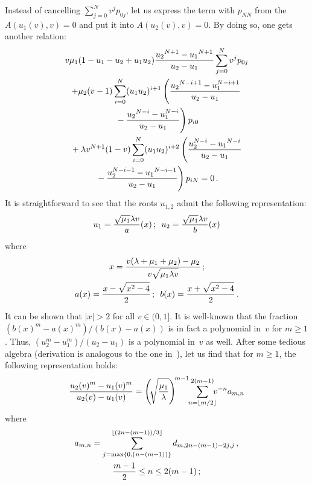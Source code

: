 \begin{multicols}{2}
\noindent
Instead of cancelling $\sum_{j=0}^N v^j p_{0j}$, let us express 
the term with $p_{NN}$ from the {$A(u_1(v),v)=0$}
and put it into ${A(u_2(v),v)=0}$. By doing so, one gets another relation:
\begin{multline}
v\mu_1(1-u_1-u_2+u_1u_2)
\displaystyle\frac{\displaystyle {u_2}^{N+1}-{u_1}^{N+1}\mathstrut}{\displaystyle u_2-u_1\mathstrut} \sum\limits_{j=0}^N v^j p_{0j}
\\
+{}
\mu_2(v-1)\sum\limits_{i=0}^N (u_1u_2)^{i+1}
\left (
\displaystyle\frac{\displaystyle {u_2}^{N-i+1}-u_1^{N-i+1}\mathstrut}{\displaystyle u_2-u_1\mathstrut}\right.\\
\left.{}-\displaystyle\frac{\displaystyle {u_2}^{N-i}-u_1^{N-i}\mathstrut}{\displaystyle u_2-u_1\mathstrut}
\right) p_{i0} 
\\
{}+
\lambda v^{N+1}(1-v)\sum\limits_{i=0}^N (u_1u_2)^{i+2}
\left (
\displaystyle\frac{\displaystyle u_2^{N-i}-{u_1}^{N-i}\mathstrut}{\displaystyle  u_2-u_1\mathstrut}
\right.\\
\left.{}-\displaystyle\frac{\displaystyle u_2^{N-i-1}-{u_1}^{N-i-1}\mathstrut}{\displaystyle u_2-u_1\mathstrut}
\right ) p_{iN}
=0\,.
\label{eq-new-2}
\end{multline}
It is straightforward to see that the roots
$u_{1,2}$ admit the following representation:
\begin{equation*}
\label{eq524}
u_{1}=
\displaystyle\frac{\displaystyle \sqrt{\mu_1}{\lambda v}\mathstrut}{\displaystyle a\mathstrut}(x)\,;\enskip
u_{2}=
\displaystyle\frac{\displaystyle \sqrt{\mu_1}{\lambda v}\mathstrut}{\displaystyle b\mathstrut}(x)
\end{equation*}
where
\begin{gather*}
x = \displaystyle\frac{\displaystyle v(\lambda+\mu_1 + \mu_2)-\mu_2\mathstrut}{\displaystyle v\sqrt{\mu_1\lambda v}\mathstrut}\,;
\\
a(x)= \displaystyle\frac{\displaystyle  x - \sqrt{x^2 -4}
\mathstrut}{\displaystyle 2\mathstrut}\,; \enskip
b(x)= \displaystyle\frac{\displaystyle  x + \sqrt{x^2 -4} \mathstrut}{\displaystyle 2\mathstrut}\,.
\end{gather*}
It can be shown that $|x|>2$ for all $v \in (0,1]$.
It is well-known that the fraction
$(b(x)^m -a(x)^m) /( b(x)-a(x))$ is in fact a polynomial in~$v$ for $m\ge 1$.
Thus, $(u_2^m - u_1^m) / (u_2-u_1)$ is a polynomial in~$v$ as well.
After some tedious algebra (derivation is analogous to the one in~\cite{xx3}), 
let us find that for $m\ge1$, the following
representation holds:
\begin{equation}
\hspace*{-0.3mm}\fr{u_2(v)^m - u_1(v)^m }{u_2(v)-u_1(v)}
=
\left (\!
\sqrt{\fr{\mu_1}{\lambda}}\right)^{\!m-1}\!\!
\sum\limits_{n=\left\lfloor{m}/{2}\right\rfloor}^{2(m-1)}\hspace*{-2mm}
v^{-n}a_{m,n}\!
\label{eq_tran}
\end{equation}
where 
\begin{multline*}
a_{m,n}=\sum\limits_{j=\max\left\{0,\left\lceil n-(m-1)\right\rceil\right\}}
^{\lfloor(2n-(m-1))/3\rfloor}
d_{m,2n-(m-1)-2j,j}\,,\\ \displaystyle\frac{\displaystyle m-1\mathstrut}{\displaystyle 2\mathstrut}\leq n\leq 2(m-1)\,;
\end{multline*}


\end{multicols}
